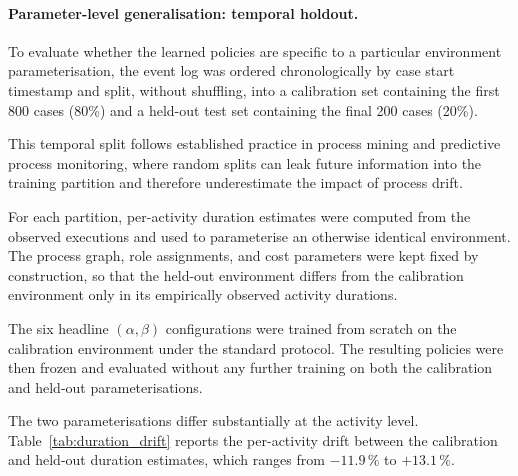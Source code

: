 \paragraph{Parameter-level generalisation: temporal holdout.}

To evaluate whether the learned policies are specific to a particular
environment parameterisation, the event log was ordered
chronologically by case start timestamp and split, without
shuffling, into a calibration set containing the first 800 cases
(80\%) and a held-out test set containing the final 200 cases
(20\%).

This temporal split follows established practice in process mining
and predictive process monitoring, where random splits can leak
future information into the training partition and therefore
underestimate the impact of process drift.

For each partition, per-activity duration estimates were computed
from the observed executions and used to parameterise an otherwise
identical environment. The process graph, role assignments, and cost
parameters were kept fixed by construction, so that the held-out
environment differs from the calibration environment only in its
empirically observed activity durations.

The six headline $(\alpha,\beta)$ configurations were trained from
scratch on the calibration environment under the standard protocol.
The resulting policies were then frozen and evaluated without any
further training on both the calibration and held-out
parameterisations.

The two parameterisations differ substantially at the activity level.
Table~\ref{tab:duration_drift} reports the per-activity drift between
the calibration and held-out duration estimates, which ranges from
$-11.9\,\%$ to $+13.1\,\%$.

